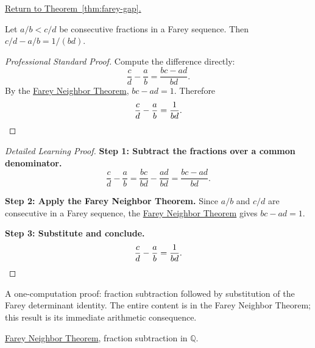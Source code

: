 
\newpage
{}
\label{prf:farey-gap}

\begin{remark*}[Return]
\hyperref[thm:farey-gap]{Return to Theorem~\ref*{thm:farey-gap}.}
\end{remark*}

\begin{theorem*}
Let $a/b < c/d$ be consecutive fractions in a Farey sequence.
Then $c/d - a/b = 1/(bd)$.
\end{theorem*}

\begin{proof}[Professional Standard Proof]
\LRAProofBodyStart
Compute the difference directly:
\[
\frac{c}{d} - \frac{a}{b}
= \frac{bc - ad}{bd}.
\]
By the \hyperref[thm:farey-neighbor-theorem]{Farey Neighbor Theorem},
$bc - ad = 1$.  Therefore
\[
\frac{c}{d} - \frac{a}{b} = \frac{1}{bd}.
\qedhere
\]
\end{proof}

\begin{proof}[Detailed Learning Proof]
\LRAProofBodyStart
\textbf{Step 1: Subtract the fractions over a common denominator.}
\[
\frac{c}{d} - \frac{a}{b}
= \frac{bc}{bd} - \frac{ad}{bd}
= \frac{bc - ad}{bd}.
\]

\textbf{Step 2: Apply the Farey Neighbor Theorem.}
Since $a/b$ and $c/d$ are consecutive in a Farey sequence, the
\hyperref[thm:farey-neighbor-theorem]{Farey Neighbor Theorem}
gives $bc - ad = 1$.

\textbf{Step 3: Substitute and conclude.}
\[
\frac{c}{d} - \frac{a}{b} = \frac{1}{bd}.
\qedhere
\]
\end{proof}

\begin{remark*}
A one-computation proof: fraction subtraction followed by substitution
of the Farey determinant identity.  The entire content is in the Farey
Neighbor Theorem; this result is its immediate arithmetic consequence.
\end{remark*}

\begin{dependencies}
\hyperref[thm:farey-neighbor-theorem]{Farey Neighbor Theorem},
fraction subtraction in $\mathbb{Q}$.
\end{dependencies}

\clearpage
